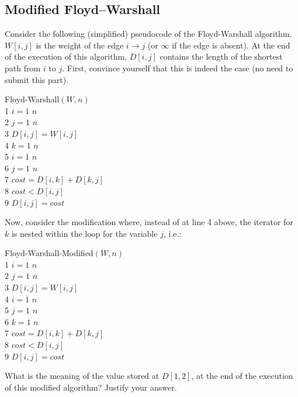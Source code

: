 \subsection{Modified Floyd--Warshall}
Consider the following (simplified) pseudocode of the Floyd-Warshall algorithm. $W[i,j]$ is the weight of the edge $i\rightarrow j$ (or $\infty$ if the edge is absent). At the end of the execution of this algorithm, $D[i,j]$ contains the length of the shortest path from $i$ to $j$. First, convince yourself that this is indeed the case (no need to submit this part).

\begin{code}
	{\sc Floyd-Warshall}$(W,n)$\\
	1 \> \For $i=1$ \To $n$\\
	2 \> \> \For $j=1$ \To $n$\\
	3 \> \> \> $D[i,j]=W[i,j]$\\
	4 \> \For $k=1$ \To $n$\\
	5 \> \> \For $i=1$ \To $n$\\
	6 \> \> \> \For $j=1$ \To $n$\\
	7 \> \> \> \> $cost=D[i,k]+D[k,j]$\\
	8 \> \> \> \> \If $cost<D[i,j]$ \\
	9 \> \> \> \> \> $D[i,j]=cost$\\
\end{code}
Now, consider the modification where, instead of at line 4 above, the iterator for $k$ is nested within the loop for the variable $j$, i.e.:
\begin{code}
	{\sc Floyd-Warshall-Modified}$(W,n)$\\
	1 \> \For $i=1$ \To $n$\\
	2 \> \> \For $j=1$ \To $n$\\
	3 \> \> \> $D[i,j]=W[i,j]$\\
	4 \> \For $i=1$ \To $n$\\
	5 \> \> \For $j=1$ \To $n$\\
	6 \> \> \> \For $k=1$ \To $n$\\
	7 \> \> \> \> $cost=D[i,k]+D[k,j]$\\
	8 \> \> \> \> \If $cost<D[i,j]$ \\
	9 \> \> \> \> \> $D[i,j]=cost$\\
\end{code}
What is the meaning of the value stored at $D[1,2]$, at the end of the execution of this modified algorithm? Justify your answer. 
